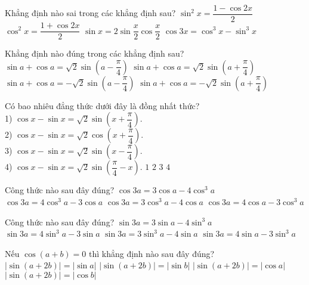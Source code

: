 \begin{ex}%
Khẳng định nào sai trong các khẳng định sau?
\choice
{$\sin ^2x=\dfrac{{1-\cos 2x}}{2}$}
{$\cos ^2x=\dfrac{{1+\cos 2x}}{2}$}
{$\sin x=2\sin \dfrac{x}{2}\cos \dfrac{x}{2}$}
{\True $\cos 3x=\cos ^3x-\sin ^3x$}
\end{ex}

\begin{ex}%
Khẳng định nào đúng trong các khẳng định sau?
\choice
{$\sin a+\cos a=\sqrt{2}\sin \left({a-\dfrac{\pi}{4}}\right)$}
{\True $\sin a+\cos a=\sqrt{2}\sin \left({a+\dfrac{\pi}{4}}\right)$}
{$\sin a+\cos a=-\sqrt{2}\sin \left({a-\dfrac{\pi}{4}}\right)$}
{$\sin a+\cos a=-\sqrt{2}\sin \left({a+\dfrac{\pi}{4}}\right)$}
\loigiai{  } 
\end{ex}

\begin{ex}%
Có bao nhiêu đẳng thức dưới đây là đồng nhất thức?\\
1) $\cos x-\sin x=\sqrt{2}\sin \left({x+\dfrac{\pi}{4}}\right).$\\
2) $\cos x-\sin x=\sqrt{2}\cos \left({x+\dfrac{\pi}{4}}\right).$\\
3) $\cos x-\sin x=\sqrt{2}\sin \left({x-\dfrac{\pi}{4}}\right).$\\
4) $\cos x-\sin x=\sqrt{2}\sin \left({\dfrac{\pi}{4}-x}\right).$
\choice
{$1$}
{\True $2$}
{$3$}
{$4$}
\end{ex}

\begin{ex}%
Công thức nào sau đây đúng?
\choice
{$\cos 3a=3\cos a-4\cos ^3a$}
{\True $\cos 3a=4\cos ^3a-3\cos a$}
{$\cos 3a=3\cos ^3a-4\cos a$}
{$\cos 3a=4\cos a-3\cos ^3a$}
\loigiai{  } 
\end{ex}

\begin{ex}%
Công thức nào sau đây đúng?
\choice
{\True $\sin 3a=3\sin a-4\sin ^3a$}
{$\sin 3a=4\sin ^3a-3\sin a$}
{$\sin 3a=3\sin ^3a-4\sin a$}
{$\sin 3a=4\sin a-3\sin ^3a$}
\loigiai{  } 
\end{ex}

\begin{ex}%
Nếu $\cos \left({a+b}\right)=0$ thì khẳng định nào sau đây đúng?
\choice
{$\left|{\sin \left({a+2b}\right)}\right|=\left|{\sin a}\right|$}
{$\left|{\sin \left({a+2b}\right)}\right|=\left|{\sin b}\right|$}
{$\left|{\sin \left({a+2b}\right)}\right|=\left|{\cos a}\right|$}
{\True $\left|{\sin \left({a+2b}\right)}\right|=\left|{\cos b}\right|$}
\end{ex}

